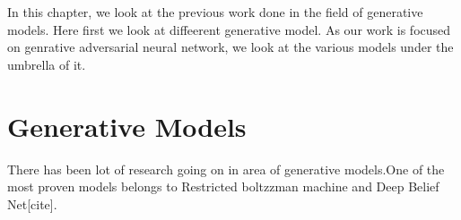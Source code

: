 

\doublespacing


In this chapter, we look at the previous work done in the field of generative models. Here first we look at diffeerent generative model. As our work is focused on genrative adversarial neural network, we look at the various models under the umbrella of it. %
\section{Generative Models}

There has been lot of research going on in area of generative models.One of the most proven models belongs to Restricted boltzzman machine and Deep Belief Net[cite].






